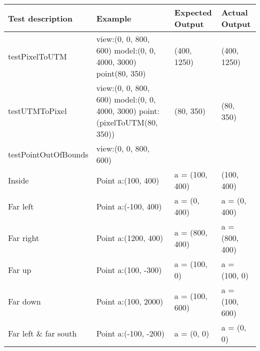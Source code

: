 \begin{centering}
\begin{longtable}{|p{3.5cm}|p{3cm}|p{3cm}|p{3cm}|}
\hline
Test description & Example & Expected Output & Actual Output\\
\hline
\hline
testPixelToUTM & view:(0, 0, 800, 600) model:(0, 0, 4000, 3000) point(80, 350) &
(400, 1250) & (400, 1250)\\
\hline
\hline
testUTMToPixel & view:(0, 0, 800, 600) model:(0, 0, 4000, 3000)
point:(pixelToUTM(80, 350)) & (80, 350) & (80, 350)\\
\hline
\hline
testPointOutOfBounds & view:(0, 0, 800, 600) & & \\
\hline
Inside & Point a:(100, 400) & a = (100, 400) & (100, 400)\\
\hline
Far left & Point a:(-100, 400) & a = (0, 400) & a = (0, 400)\\
\hline
Far right & Point a:(1200, 400) & a = (800, 400) & a = (800, 400)\\
\hline
Far up & Point a:(100, -300) & a = (100, 0) & a = (100, 0)\\
\hline
Far down & Point a:(100, 2000) & a = (100, 600) & a = (100, 600)\\
\hline
Far left \& far south & Point a:(-100, -200) & a = (0, 0) & a = (0, 0)\\
\hline
\end{longtable}
\end{centering}